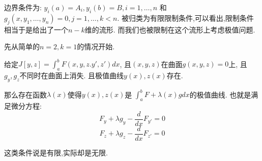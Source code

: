边界条件为:
\(y_i(a) = A_i, y_i(b) = B, i = 1,\dots,n\) 和
\(g_j(x,y_1,\dots,y_n) = 0, j = 1,\dots,k < n\).
被归类为有限限制条件,可以看出,限制条件相当于是给出了一个\(n - k\)维的流形.
而我们也被限制在这个流形上考虑极值问题.

先从简单的\(n = 2, k = 1\)的情况开始.
\begin{thm}

    给定\(J[y,z] = \int_a^b F(x,y,z.y',z')dx\),
    且\((x,y,z)\)在曲面\(g(x,y,z) = 0\)上,
    且\(g_y, g_z\)不同时在曲面上消失.
    且极值曲线\(y(x),z(x)\)存在.

    那么存在函数\(\lambda (x)\)使得\(y(x),z(x)\)是
    \(\int_a^b F+ \lambda (x)g dx\)的极值曲线.
    也就是满足微分方程:
    \[F_y + \lambda g_y - \frac{d}{dx}F_{y'} = 0\]
    \[F_z + \lambda g_z - \frac{d}{dx}F_{z'} = 0\]

\end{thm}

这类条件说是有限,实际却是无限.

